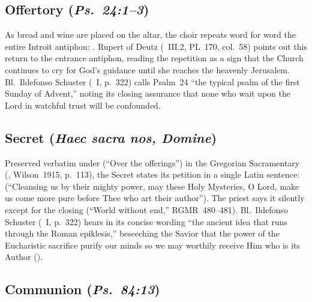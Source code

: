 \subsection{Offertory (\textit{Ps.~24:1--3})}

As bread and wine are placed on the altar, the choir repeats word for word the entire Introit antiphon: . Rupert of Deutz (~III.2, PL~170, col.~58) points out this return to the entrance antiphon, reading the repetition as a sign that the Church continues to cry for God's guidance until she reaches the heavenly Jerusalem. Bl.~Ildefonso Schuster (~I, p.~322) calls Psalm~24 ``the typical psalm of the first Sunday of Advent,'' noting its closing assurance that none who wait upon the Lord in watchful trust will be confounded.

\subsection{Secret (\textit{Haec sacra nos, Domine})}

Preserved verbatim under  (``Over the offerings'') in the Gregorian Sacramentary (, Wilson~1915, p.~113), the Secret states its petition in a single Latin sentence:  (``Cleansing us by their mighty power, may these Holy Mysteries, O Lord, make us come more pure before Thee who art their author''). The priest says it silently except for the closing  (``World without end,'' RGMR~480--481). Bl.~Ildefonso Schuster (~I, p.~322) hears in its concise wording ``the ancient idea that runs through the Roman epiklesis,'' beseeching the Savior that the power of the Eucharistic sacrifice purify our minds so we may worthily receive Him who is its Author ().

\subsection{Communion (\textit{Ps.~84:13})}


